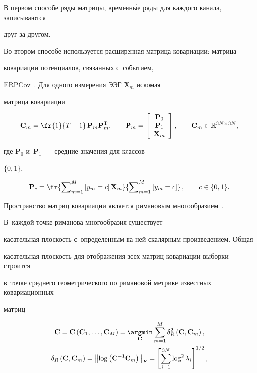 В первом способе ряды матрицы, временн\'{ы}е ряды для каждого канала, записываются 

друг за другом.

Во втором способе используется расширенная матрица ковариации: матрица 

ковариации потенциалов, связанных с~событием, 

ERPCov~\cite{Plug_and_Play_P300_BCI}. Для одного измерения ЭЭГ $\mathbf{X}_m$ искомая 

матрица ковариации

$$

    \mathbf{C}_{m}=\fr{1}{T-1}\,\mathbf{P}_{m} \mathbf{P}_{m}^{\mathrm{T}}, \qquad

    \mathbf{P}_{m}=\left[\begin{array}{c}\mathbf{P}_{0} \\ \mathbf{P}_{1} \\ 

\mathbf{X}_{m}\end{array}\right], \qquad\mathbf{C}_{m} \in \mathbb{R}^{3N \times 3N}, 

$$

где $\mathbf{P}_{0}$ и~$\mathbf{P}_{1}$~--- средние значения для классов 

$\{0,1\}$,

$$

    \mathbf{P}_{c} = \fr{\sum\nolimits_{m=1}^{M}\left[y_m = c\right] 

\mathbf{X}_{m}}{\sum\nolimits_{m=1}^{M}\left[y_m = c\right]}\,, \qquad c \in \{0, 1 \}.

$$

Пространство матриц ковариации является римановым многообразием~\cite{Plug_and_Play_P300_BCI}. 

В~каж\-дой точке риманова многообразия существует 

касательная плос\-кость с~определенным на ней скалярным произведением. Общая 

касательная плос\-кость для отображения всех мат\-риц ковариации выборки строится 

в~точ\-ке среднего гео\-мет\-ри\-че\-ско\-го по римановой мет\-ри\-ке известных ковариационных 

матриц

\begin{multline*}

    \mathbf{C}=\mathbf{C}\left(\mathbf{C}_{1}, \ldots, \mathbf{C}_{M}\right)=\underset{\mathbf{C}}{\argmin } 

    \sum\limits_{m=1}^{M} \delta_{R}^{2}\left(\mathbf{C}, 

\mathbf{C}_{m}\right),

\\

    \delta_{R}\left(\mathbf{C}, \mathbf{C}_{m}\right)=\left\|\log 

\left(\mathbf{C}^{-1} \mathbf{C}_{m}\right)\right\|_{F}=\left[\sum\limits_{i=1}^{3N} 

\log ^{2} \lambda_{i}\right]^{{1}/{2}},

\end{multline*}

